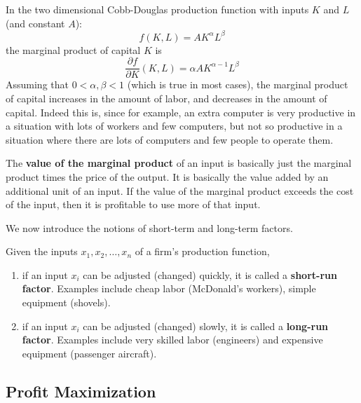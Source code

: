 \documentclass{article}
\begin{document}
    \begin{example}
      \label{ex:marginal-product-in-cobb-douglas-function}
      In the two dimensional Cobb-Douglas production function with inputs $K$ and $L$ (and constant $A$):  
      \begin{equation}
        f (K, L) = A K^\alpha L^\beta
      \end{equation}
      the marginal product of capital $K$ is 
      \begin{equation}
        \frac{\partial f}{\partial K} (K, L) = \alpha A K^{\alpha-1} L^\beta
      \end{equation}
      Assuming that $0 < \alpha, \beta < 1$ (which is true in most cases), the marginal product of capital increases in the amount of labor, and decreases in the amount of capital. Indeed this is, since for example, an extra computer is very productive in a situation with lots of workers and few computers, but not so productive in a situation where there are lots of computers and few people to operate them. 

      The \textbf{value of the marginal product} of an input is basically just the marginal product times the price of the output. It is basically the value added by an additional unit of an input. If the value of the marginal product exceeds the cost of the input, then it is profitable to use more of that input. 
    \end{example}

    We now introduce the notions of short-term and long-term factors. 

    \begin{definition}
      \label{def:short-run-and-long-run-factors}
      Given the inputs $x_1, x_2, \ldots, x_n$ of a firm's production function, 
      \begin{enumerate}
        \item if an input $x_i$ can be adjusted (changed) quickly, it is called a \textbf{short-run factor}. Examples include cheap labor (McDonald's workers), simple equipment (shovels). 
        \item if an input $x_i$ can be adjusted (changed) slowly, it is called a \textbf{long-run factor}. Examples include very skilled labor (engineers) and expensive equipment (passenger aircraft).
      \end{enumerate}
    \end{definition}

  \subsection{Profit Maximization}
\end{document}
